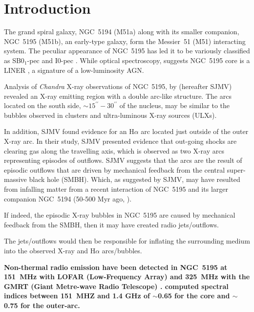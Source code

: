 \documentclass[fleqn,usenatbib]{mnras}
\begin{document}
\section{Introduction}


The grand spiral galaxy, NGC~5194 (M51a) along with its smaller companion, NGC~5195 (M51b), an
early-type galaxy, form the Messier~51 (M51) interacting system. The peculiar appearance of NGC~5195 has led it to be variously classified as SB0$_{1}$-pec 
\citep{SandageTammann1981} and I0-pec \citep{RC3}. While optical spectroscopy, suggests NGC~5195 core is 
a LINER \citep{hoetal1997}, a signature of a low-luminosity AGN.  
 
Analysis of \textit{Chandra} X-ray observations of NGC~5195, by \cite{SJMV} (hereafter 
SJMV) revealed an X-ray emitting region with a double arc-like structure. The arcs located on the 
south side, $\sim15^{\prime \prime} - 30^{\prime \prime} $ of the nucleus, may be 
similar to the bubbles observed in clusters and ultra-luminous X-ray sources (ULXs).  

In addition, SJMV found evidence for an  H$\alpha$ 
arc located just outside of the outer X-ray arc. In their study, SJMV presented evidence that out-going 
shocks are clearing gas along the travelling axis, which is observed as two X-ray arcs representing 
episodes of outflows.  SJMV suggests that the arcs are 
the result of episodic outflows that are driven by mechanical feedback from the central super-massive black hole (SMBH). 
Which, as suggested by SJMV, may have resulted from infalling matter from a recent interaction of NGC~5195 
and its larger companion NGC~5194  (50-500 Myr ago, \cite{SL2000,Dobbsetal2010,Mentuchetal2012}). 


If indeed, the episodic X-ray bubbles in NGC~5195 are caused by mechanical feedback from the SMBH, then it may have created radio jets/outflows. 

The jets/outflows would then be responsible for inflating the surrounding medium into the observed X-ray and H$\alpha$ arcs/bubbles. 

\textbf{Non-thermal radio emission have been detected in NGC~5195 at 151~MHz with LOFAR (Low-Frequency Array) \citep{Mulcahyetal2014} and 325~MHz with the GMRT (Giant Metre-wave Radio Telescope) \citep{Mulcahyetal2016}.
\cite{Mulcahyetal2014} computed spectral indices between 151~MHZ and 1.4 GHz of $\sim$0.65 for the core and $\sim$0.75 for the outer-arc. }
 
\end{document}
